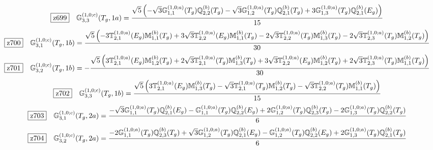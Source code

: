 \documentclass[fleqn,10pt,landscape]{jsarticle}
\begin{document}
\begin{dmath*}
\hspace*{3mm}\fbox{z699}\quad \mathbb{G}_{3,3}^{(1,0;c)}(T_{g},1a)=\frac{\sqrt{5} \left(- \sqrt{3} \mathbb{G}_{1,1}^{(1,0;a)}(T_{g}) \mathbb{Q}_{2,2}^{(b)}(T_{g}) - \sqrt{3} \mathbb{G}_{1,2}^{(1,0;a)}(T_{g}) \mathbb{Q}_{2,1}^{(b)}(T_{g}) + 3 \mathbb{G}_{1,3}^{(1,0;a)}(T_{g}) \mathbb{Q}_{2,1}^{(b)}(E_{g})\right)}{15}
\end{dmath*}
\begin{dmath*}
\hspace*{3mm}\fbox{z700}\quad \mathbb{G}_{3,1}^{(1,0;c)}(T_{g},1b)=\frac{\sqrt{5} \left(- 3 \mathbb{T}_{2,1}^{(1,0;a)}(E_{g}) \mathbb{M}_{1,1}^{(b)}(T_{g}) + 3 \sqrt{3} \mathbb{T}_{2,2}^{(1,0;a)}(E_{g}) \mathbb{M}_{1,1}^{(b)}(T_{g}) - 2 \sqrt{3} \mathbb{T}_{2,2}^{(1,0;a)}(T_{g}) \mathbb{M}_{1,3}^{(b)}(T_{g}) - 2 \sqrt{3} \mathbb{T}_{2,3}^{(1,0;a)}(T_{g}) \mathbb{M}_{1,2}^{(b)}(T_{g})\right)}{30}
\end{dmath*}
\begin{dmath*}
\hspace*{3mm}\fbox{z701}\quad \mathbb{G}_{3,2}^{(1,0;c)}(T_{g},1b)=- \frac{\sqrt{5} \left(3 \mathbb{T}_{2,1}^{(1,0;a)}(E_{g}) \mathbb{M}_{1,2}^{(b)}(T_{g}) + 2 \sqrt{3} \mathbb{T}_{2,1}^{(1,0;a)}(T_{g}) \mathbb{M}_{1,3}^{(b)}(T_{g}) + 3 \sqrt{3} \mathbb{T}_{2,2}^{(1,0;a)}(E_{g}) \mathbb{M}_{1,2}^{(b)}(T_{g}) + 2 \sqrt{3} \mathbb{T}_{2,3}^{(1,0;a)}(T_{g}) \mathbb{M}_{1,1}^{(b)}(T_{g})\right)}{30}
\end{dmath*}
\begin{dmath*}
\hspace*{3mm}\fbox{z702}\quad \mathbb{G}_{3,3}^{(1,0;c)}(T_{g},1b)=\frac{\sqrt{5} \left(3 \mathbb{T}_{2,1}^{(1,0;a)}(E_{g}) \mathbb{M}_{1,3}^{(b)}(T_{g}) - \sqrt{3} \mathbb{T}_{2,1}^{(1,0;a)}(T_{g}) \mathbb{M}_{1,2}^{(b)}(T_{g}) - \sqrt{3} \mathbb{T}_{2,2}^{(1,0;a)}(T_{g}) \mathbb{M}_{1,1}^{(b)}(T_{g})\right)}{15}
\end{dmath*}
\begin{dmath*}
\hspace*{3mm}\fbox{z703}\quad \mathbb{G}_{3,1}^{(1,0;c)}(T_{g},2a)=\frac{- \sqrt{3} \mathbb{G}_{1,1}^{(1,0;a)}(T_{g}) \mathbb{Q}_{2,1}^{(b)}(E_{g}) - \mathbb{G}_{1,1}^{(1,0;a)}(T_{g}) \mathbb{Q}_{2,2}^{(b)}(E_{g}) + 2 \mathbb{G}_{1,2}^{(1,0;a)}(T_{g}) \mathbb{Q}_{2,3}^{(b)}(T_{g}) - 2 \mathbb{G}_{1,3}^{(1,0;a)}(T_{g}) \mathbb{Q}_{2,2}^{(b)}(T_{g})}{6}
\end{dmath*}
\begin{dmath*}
\hspace*{3mm}\fbox{z704}\quad \mathbb{G}_{3,2}^{(1,0;c)}(T_{g},2a)=\frac{- 2 \mathbb{G}_{1,1}^{(1,0;a)}(T_{g}) \mathbb{Q}_{2,3}^{(b)}(T_{g}) + \sqrt{3} \mathbb{G}_{1,2}^{(1,0;a)}(T_{g}) \mathbb{Q}_{2,1}^{(b)}(E_{g}) - \mathbb{G}_{1,2}^{(1,0;a)}(T_{g}) \mathbb{Q}_{2,2}^{(b)}(E_{g}) + 2 \mathbb{G}_{1,3}^{(1,0;a)}(T_{g}) \mathbb{Q}_{2,1}^{(b)}(T_{g})}{6}
\end{dmath*}
\end{document}

